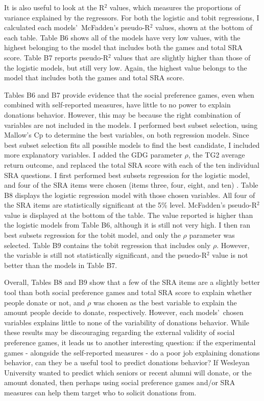 \documentclass[12pt]{article}
\begin{document}
It is also useful to look at the R$^{2}$ values, which measures the proportions of variance explained by the regressors. For both the logistic and tobit regressions, I calculated each models\rq \ McFadden\rq s pseudo-R$^{2}$ values, shown at the bottom of each table. Table B6 shows all of the models have very low values, with the highest belonging to the model that includes both the games and total SRA score. Table B7 reports pseudo-R$^{2}$ values that are slightly higher than those of the logistic models, but still very low. Again, the highest value belongs to the model that includes both the games and total SRA score. 

Tables B6 and B7 provide evidence that the social preference games, even when combined with self-reported measures, have little to no power to explain donations behavior. However, this may be because the right combination of variables are not included in the models. I performed best subset selection, using Mallow\rq s Cp to determine the best variables, on both regression models. Since best subset selection fits all possible models to find the best candidate, I included more explanatory variables. I added the GDG parameter \(\rho\), the TG2 average return outcome, and replaced the total SRA score with each of the ten individual SRA questions. I first performed best subsets regression for the logistic model, and four of the SRA items were chosen (items three, four, eight, and ten) . Table B8 displays the logistic regression model with those chosen variables. All four of the SRA items are statistically significant at the 5\% level. McFadden\rq s pseudo-R$^{2}$ value is displayed at the bottom of the table. The value reported is higher than the logistic models from Table B6, although it is still not very high. I then ran best subsets regression for the tobit model, and only the \(\rho\) parameter was selected. Table B9 contains the tobit regression that includes only \(\rho\). However, the variable is still not statistically significant, and the psuedo-R$^{2}$ value is not better than the models in Table B7.

Overall, Tables B8 and B9 show that a few of the SRA items are a slightly better tool than both social preference games and total SRA score to explain whether people donate or not, and \(\rho\) was chosen as the best variable to explain the amount people decide to donate, respectively. However, each models\rq \ chosen variables explains little to none of the variability of donations behavior. While these results may be discouraging regarding the external validity of social preference games, it leads us to another interesting question: if the experimental games - alongside the self-reported measures - do a poor job explaining donations behavior, can they be a useful tool to predict donations behavior? If Wesleyan University wanted to predict which seniors or recent alumni will donate, or the amount donated, then perhaps using social preference games and/or SRA measures can help them target who to solicit donations from.
\end{document}
